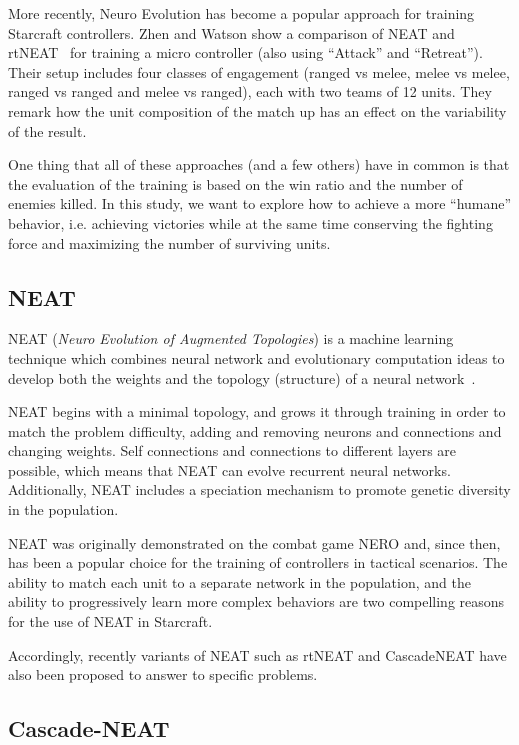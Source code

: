 More recently, Neuro Evolution has become a popular approach for
training Starcraft controllers. Zhen and Watson show a comparison of
NEAT and rtNEAT~\cite{ShWa13} for training a micro controller (also
using ``Attack'' and ``Retreat''). Their setup includes four classes
of engagement (ranged vs melee, melee vs melee, ranged vs ranged and
melee vs ranged), each with two teams of 12 units. They remark how the
unit composition of the match up has an effect on the variability of
the result.

One thing that all of these approaches (and a few others) have in
common is that the evaluation of the training is based on the win
ratio and the number of enemies killed. In this study, we want to
explore how to achieve a more ``humane'' behavior, i.e. achieving
victories while at the same time conserving the fighting force and
maximizing the number of surviving units.

\subsection{NEAT}\label{subsec:neat}

NEAT (\emph{Neuro Evolution of Augmented Topologies}) is a machine
learning technique which combines neural network and evolutionary
computation ideas to develop both the weights and the topology
(structure) of a neural network~\cite{StMi02}.

NEAT begins with a minimal topology, and grows it through training in
order to match the problem difficulty, adding and removing neurons and
connections and changing weights. Self connections and connections to
different layers are possible, which means that NEAT can evolve
recurrent neural networks. Additionally, NEAT includes a speciation
mechanism to promote genetic diversity in the population.

NEAT was originally demonstrated on the combat game NERO and, since
then, has been a popular choice for the training of controllers in
tactical scenarios. The ability to match each unit to a separate
network in the population, and the ability to progressively learn more
complex behaviors are two compelling reasons for the use of NEAT in
Starcraft.

Accordingly, recently variants of NEAT such as rtNEAT and CascadeNEAT
have also been proposed to answer to specific problems.

\subsection{Cascade-NEAT}\label{subsec:cascade-neat}


